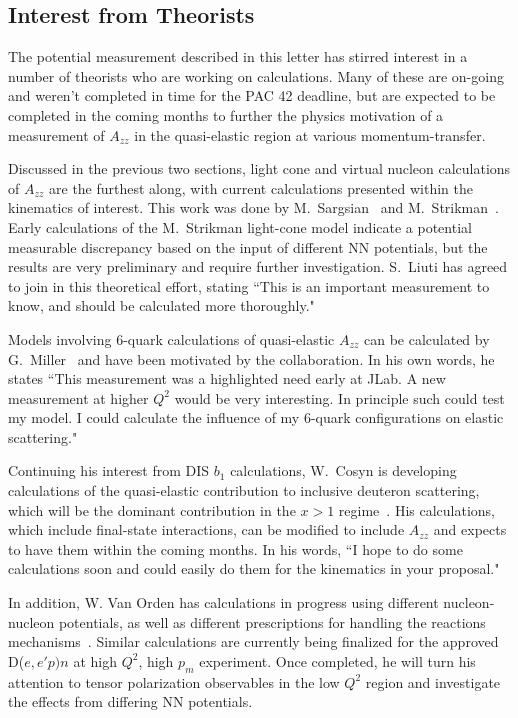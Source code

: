 \subsection{Interest from Theorists}

The potential measurement described in this letter has stirred interest in a number of theorists who are working on calculations. Many of these are on-going and weren't completed in time for the PAC 42 deadline, but are expected to be completed in the coming months to further the physics motivation of a measurement of $A_{zz}$ in the quasi-elastic region at various momentum-transfer.

Discussed in the previous two sections, light cone and virtual nucleon calculations of $A_{zz}$ are the furthest along, with current calculations presented within the kinematics of interest. This work was done by M.~Sargsian~\cite{misak-convo} and M.~Strikman~\cite{strikman-convo}. Early calculations of the M.~Strikman light-cone model indicate a potential measurable discrepancy based on the input of different NN potentials, but the results are very preliminary and require further investigation. S.~Liuti has agreed to join in this theoretical effort, stating ``This is an important measurement to know, and should be calculated more thoroughly."~\cite{liuti-convo}

Models involving 6-quark calculations of quasi-elastic $A_{zz}$ can be calculated by G.~Miller~\cite{miller-convo} and have been motivated by the collaboration. In his own words, he states ``This measurement was a highlighted need early at JLab. A new measurement at higher $Q^2$ would be very interesting. In principle such could test my model. I could calculate the influence of my 6-quark configurations on elastic scattering."

Continuing his interest from DIS $b_1$ calculations, W.~Cosyn is developing calculations of the quasi-elastic contribution to inclusive deuteron scattering, which will be the dominant contribution in the $x>1$ regime~\cite{cosyn-convo}. His calculations, which include final-state interactions, can be modified to include $A_{zz}$ and expects to have them within the coming months. In his words, ``I hope to do some 
calculations soon and could easily do them for the kinematics in your 
proposal."


In addition, W. Van Orden has calculations in progress using different nucleon-nucleon potentials, as well as different prescriptions for handling the reactions mechanisms~\cite{vanorden-convo}.  Similar calculations are currently being finalized for the approved
D($e,e'p)n$ at high $Q^2$, high $p_m$ experiment. Once completed, he will turn his attention to tensor polarization observables in the low $Q^2$ region and investigate the effects from differing NN potentials.